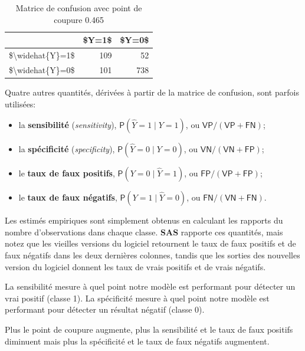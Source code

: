 \documentclass[
  11pt,
  letterpaper,
]{book}
\providecommand{\tightlist}{%
  \setlength{\itemsep}{0pt}\setlength{\parskip}{0pt}}
\theoremstyle{definition}
\theoremstyle{definition}
\theoremstyle{definition}
\theoremstyle{definition}
\theoremstyle{remark}
\begin{document}
\begin{table}

\caption{\label{tab:confumat}Matrice de confusion avec point de coupure 0.465}
\centering
\begin{tabular}[t]{l|r|r}
\hline
  & \$Y=1\$ & \$Y=0\$\\
\hline
\$\textbackslash{}widehat\{Y\}=1\$ & 109 & 52\\
\hline
\$\textbackslash{}widehat\{Y\}=0\$ & 101 & 738\\
\hline
\end{tabular}
\end{table}

Quatre autres quantités, dérivées à partir de la matrice de confusion, sont parfois utilisées:

\begin{itemize}
\tightlist
\item
  la \textbf{sensibilité} (\emph{sensitivity}), \({\mathsf P}\left(\widehat{Y}=1 \mid Y=1\right)\), ou \(\mathsf{VP}/(\mathsf{VP}+\mathsf{FN})\);
\item
  la \textbf{spécificité} (\emph{specificity}), \({\mathsf P}\left(\widehat{Y}=0 \mid Y=0\right)\), ou \(\mathsf{VN}/(\mathsf{VN}+\mathsf{FP})\);
\item
  le \textbf{taux de faux positifs}, \({\mathsf P}\left(Y=0 \mid \widehat{Y}=1\right)\), ou \(\mathsf{FP}/(\mathsf{VP}+\mathsf{FP})\);
\item
  le \textbf{taux de faux négatifs}, \({\mathsf P}\left(Y=1 \mid \widehat{Y}=0\right)\), ou \(\mathsf{FN}/(\mathsf{VN}+\mathsf{FN})\).
\end{itemize}

Les estimés empiriques sont simplement obtenus en calculant les rapports du nombre d'observations dans chaque classe. \textbf{SAS} rapporte ces quantités, mais notez que les vieilles versions du logiciel retournent le taux de faux positifs et de faux négatifs dans les deux dernières colonnes, tandis que les sorties des nouvelles version du logiciel donnent les taux de vrais positifs et de vrais négatifs.

La sensibilité mesure à quel point notre modèle est performant pour détecter un vrai positif (classe 1). La spécificité mesure à quel point notre modèle est performant pour détecter un résultat négatif (classe 0).

Plus le point de coupure augmente, plus la sensibilité et le taux de faux positifs diminuent mais plus la spécificité et le taux de faux négatifs augmentent.
\end{document}
